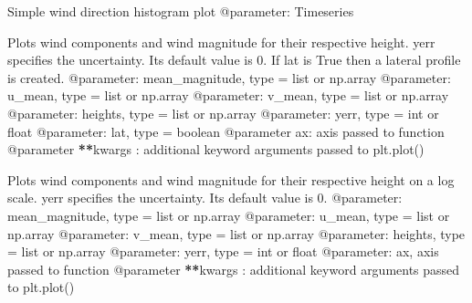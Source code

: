 \documentclass[letterpaper,10pt,english]{sphinxmanual}
\begin{document}

\begin{fulllineitems}
\label{\detokenize{index:windtunnel.plot_wind_dir_hist}}
Simple wind direction histogram plot
@parameter: Timeseries

\end{fulllineitems}


\begin{fulllineitems}
\label{\detokenize{index:windtunnel.plot_winddata}}
Plots wind components and wind magnitude for their respective height.
yerr specifies the uncertainty. Its default value is 0. If lat is True then
a lateral profile is created.
@parameter: mean\_magnitude, type = list or np.array
@parameter: u\_mean, type = list or np.array
@parameter: v\_mean, type = list or np.array
@parameter: heights, type = list or np.array
@parameter: yerr, type = int or float
@parameter: lat, type = boolean
@parameter ax: axis passed to function
@parameter {\color{red}\bfseries{}**}kwargs : additional keyword arguments passed to plt.plot()

\end{fulllineitems}


\begin{fulllineitems}
\label{\detokenize{index:windtunnel.plot_winddata_log}}
Plots wind components and wind magnitude for their respective height on
a log scale. yerr specifies the uncertainty. Its default value is 0.
@parameter: mean\_magnitude, type = list or np.array
@parameter: u\_mean, type = list or np.array
@parameter: v\_mean, type = list or np.array
@parameter: heights, type = list or np.array
@parameter: yerr, type = int or float
@parameter: ax, axis passed to function
@parameter {\color{red}\bfseries{}**}kwargs : additional keyword arguments passed to plt.plot()

\end{fulllineitems}
\end{document}

